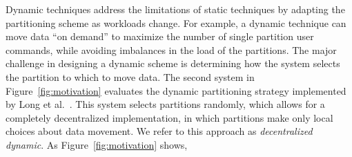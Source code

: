 Dynamic techniques address the limitations of static techniques by adapting
the partitioning scheme as workloads change.  
For example, a dynamic technique can move data ``on demand'' to maximize the number of single partition user commands, while avoiding imbalances in the load of the partitions.  
The major challenge in designing a dynamic
scheme is determining how the system selects the partition to which to
move data.
%
The second system in Figure~\ref{fig:motivation} evaluates the dynamic
partitioning strategy implemented by  Long et al.~\cite{hoang2016}.
This system selects partitions randomly, which allows for a completely 
decentralized implementation, in which partitions make only local
choices about data movement.  We refer to this approach as
\emph{decentralized dynamic}.  As Figure~\ref{fig:motivation} shows,
